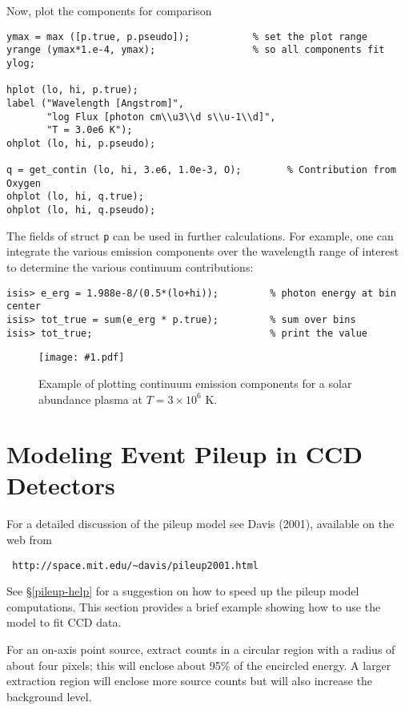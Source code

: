 \documentclass{book}
\newcommand{\putfig}[1]{\texttt{[image: \#1.pdf]}}
\newcommand{\putfig}[1]{\psfig{file=#1.ps}}
\begin{document}
{Now, plot the components for comparison
\begin{verbatim}
ymax = max ([p.true, p.pseudo]);           % set the plot range
yrange (ymax*1.e-4, ymax);                 % so all components fit
ylog;

hplot (lo, hi, p.true);
label ("Wavelength [Angstrom]",
       "log Flux [photon cm\\u3\\d s\\u-1\\d]",
       "T = 3.0e6 K");
ohplot (lo, hi, p.pseudo);

q = get_contin (lo, hi, 3.e6, 1.0e-3, O);        % Contribution from Oxygen
ohplot (lo, hi, q.true);
ohplot (lo, hi, q.pseudo);
\end{verbatim}

The fields of struct {\tt p} can be used in further calculations. For
example, one can integrate the various emission components over the
wavelength range of interest to determine the various continuum
contributions:
\begin{verbatim}
isis> e_erg = 1.988e-8/(0.5*(lo+hi));         % photon energy at bin center
isis> tot_true = sum(e_erg * p.true);         % sum over bins
isis> tot_true;                               % print the value
\end{verbatim}

\begin{figure}[ht]
\putfig{figures/contin}
\caption{Example of plotting continuum emission components for a solar abundance plasma at $T = 3 \times 10^6$ K.}
\label{fig:contin}
\end{figure}

\section{Modeling Event Pileup in CCD Detectors}
\label{sec:pileup}

For a detailed discussion of the pileup model see Davis (2001),
available on the web from
\begin{verbatim}
 http://space.mit.edu/~davis/pileup2001.html
\end{verbatim}
See \S\ref{pileup-help} for a suggestion on how to speed up
the pileup model computations.
This section provides a brief example showing how to use the
model to fit CCD data.

For an on-axis point source, extract counts in a circular region
with a radius of about four pixels; this will enclose
about 95\% of the encircled energy.  A larger extraction
region will enclose more source counts but will also increase
the background level.

}
\end{document}
